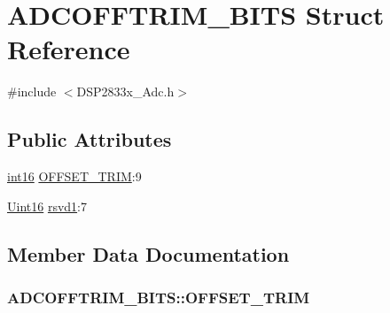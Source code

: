 \hypertarget{struct_a_d_c_o_f_f_t_r_i_m___b_i_t_s}{}\section{A\+D\+C\+O\+F\+F\+T\+R\+I\+M\+\_\+\+B\+I\+T\+S Struct Reference}
\label{struct_a_d_c_o_f_f_t_r_i_m___b_i_t_s}


{\ttfamily \#include $<$D\+S\+P2833x\+\_\+\+Adc.\+h$>$}

\subsection*{Public Attributes}
\begin{DoxyCompactItemize}
\item 
\hyperlink{_d_s_p2833x___device_8h_a74c874318b0a5111bb5c5119fa8c71b5}{int16} \hyperlink{struct_a_d_c_o_f_f_t_r_i_m___b_i_t_s_ad51fe5d19ad6223a0340dc84bc246e2d}{O\+F\+F\+S\+E\+T\+\_\+\+T\+R\+I\+M}\+:9
\item 
\hyperlink{_d_s_p2833x___device_8h_a59a9f6be4562c327cbfb4f7e8e18f08b}{Uint16} \hyperlink{struct_a_d_c_o_f_f_t_r_i_m___b_i_t_s_ab0345669cb0764ee41ba705b1ddaf8bf}{rsvd1}\+:7
\end{DoxyCompactItemize}


\subsection{Member Data Documentation}
\hypertarget{struct_a_d_c_o_f_f_t_r_i_m___b_i_t_s_ad51fe5d19ad6223a0340dc84bc246e2d}{}
\subsubsection[{O\+F\+F\+S\+E\+T\+\_\+\+T\+R\+I\+M}]{ A\+D\+C\+O\+F\+F\+T\+R\+I\+M\+\_\+\+B\+I\+T\+S\+::\+O\+F\+F\+S\+E\+T\+\_\+\+T\+R\+I\+M}\label{struct_a_d_c_o_f_f_t_r_i_m___b_i_t_s_ad51fe5d19ad6223a0340dc84bc246e2d}
\hypertarget{struct_a_d_c_o_f_f_t_r_i_m___b_i_t_s_ab0345669cb0764ee41ba705b1ddaf8bf}{}
